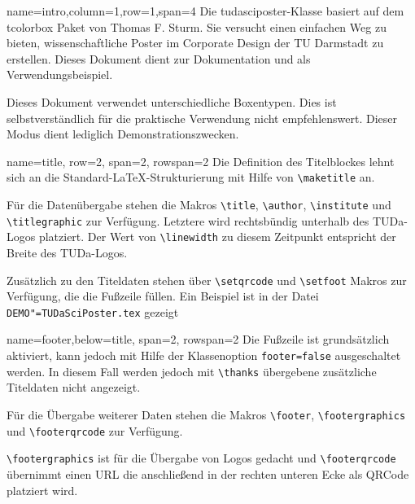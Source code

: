 \documentclass[
	accentcolor=9c,%
]{tudasciposter}
\let\file\texttt
\let\code\texttt
\let\pck\textsf
\let\cls\textsf
\newcommand{\tbs}{\textbackslash}
\newcommand*{\macro}[1]{\code{\tbs#1}}
\begin{document}
\begin{tcbposter}[
	poster={
		columns=4,
		rows=7,
		spacing=1cm,
	},]

\begin{posterboxenv}[title=Zusammenfassung]{name=intro,column=1,row=1,span=4}
	Die \cls{tudasciposter}-Klasse basiert auf dem \pck{tcolorbox} Paket von Thomas F. Sturm.
	Sie versucht einen einfachen Weg zu bieten, wissenschaftliche Poster im Corporate Design der TU Darmstadt zu erstellen.
	Dieses Dokument dient zur Dokumentation und als Verwendungsbeispiel.

	Dieses Dokument verwendet unterschiedliche Boxentypen.
	Dies ist selbstverständlich für die praktische Verwendung nicht empfehlenswert. Dieser Modus dient lediglich Demonstrationszwecken.
\end{posterboxenv}

\begin{posterboxenv}[title=Titelei]{name=title, row=2, span=2, rowspan=2}
	Die Definition des Titelblockes lehnt sich an die Standard-\LaTeX{}-Strukturierung  mit Hilfe von \macro{maketitle} an.

	Für die Datenübergabe stehen die Makros \macro{title}, \macro{author}, \macro{institute} und \macro{titlegraphic} zur Verfügung.
	Letztere wird rechtsbündig unterhalb des TUDa-Logos platziert.
	Der Wert von \macro{linewidth} zu diesem Zeitpunkt entspricht der Breite des TUDa-Logos.

	Zusätzlich zu den Titeldaten stehen über \macro{setqrcode} und \macro{setfoot} Makros zur Verfügung, die die Fußzeile füllen.
	Ein Beispiel ist in der Datei \file{DEMO"=TUDaSciPoster.tex} gezeigt
\end{posterboxenv}

\begin{posterboxenv}[title=Fußzeile]{name=footer,below=title, span=2, rowspan=2 }
	Die Fußzeile ist grundsätzlich aktiviert, kann jedoch mit Hilfe der Klassenoption \code{footer=false} ausgeschaltet werden.
	In diesem Fall werden jedoch mit \macro{thanks} übergebene zusätzliche Titeldaten nicht angezeigt.

	Für die Übergabe weiterer Daten stehen die Makros \macro{footer}, \macro{footergraphics} und \macro{footerqrcode} zur Verfügung.

	\macro{footergraphics} ist für die Übergabe von Logos gedacht und \macro{footerqrcode} übernimmt einen URL die anschließend in der rechten unteren Ecke als QRCode platziert wird.


\end{posterboxenv}
\end{tcbposter}
\end{document}
